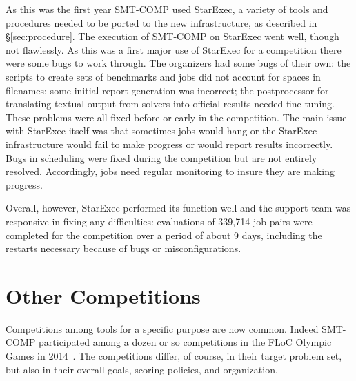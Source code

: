 \documentclass[twoside,11pt]{article}
\begin{document}
As this was the first year SMT-COMP used StarExec, a variety of tools and procedures needed to be ported to the new infrastructure, as described in \S\ref{sec:procedure}.
The execution of SMT-COMP on StarExec went well, though not flawlessly. As this was a first major use of StarExec for a competition there were some bugs to work through.
The organizers had some bugs of their own: the scripts to create sets of benchmarks and jobs did not account for spaces in filenames; some initial report generation was incorrect; the postprocessor for translating textual output from solvers into official results needed fine-tuning. These problems were all fixed before or early in the competition. The main issue with StarExec itself was that sometimes jobs would hang or the StarExec infrastructure would fail to make
progress or would report results incorrectly. Bugs in scheduling were
fixed during the competition but are not entirely resolved. Accordingly, jobs need regular monitoring to insure they are making progress.

Overall, however, StarExec performed its function well and the support team was responsive in fixing any difficulties: evaluations of 339,714 job-pairs were completed for the competition over a period of about 9 days, including the restarts necessary because of bugs or misconfigurations.

\section{Other Competitions}
\label{sec:OtherCompetitions}

Competitions among tools for a specific purpose are now common. Indeed SMT-COMP participated among a dozen or so competitions in the FLoC Olympic Games in 2014~\cite{FLoC2014}.  The competitions differ, of course, in their target problem set, but also in their overall goals, scoring policies, and organization.
 
\end{document}
